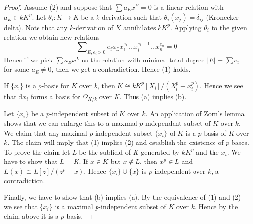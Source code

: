 \documentclass[10pt,a4paper]{amsart}
\theoremstyle{plain}
\theoremstyle{definition}
\theoremstyle{remark}
\numberwithin{equation}{subsection}
\begin{document}
\begin{proof}
Assume (2) and suppose that $\sum a_E x^E = 0$ is a linear relation
with $a_E \in k K^p$. Let $\theta_i : K \to K$ be a $k$-derivation such that
$\theta_i(x_j) = \delta_{ij}$ (Kronecker delta). Note that any $k$-derivation
of $K$ annihilates $kK^p$. Applying $\theta_i$ to the given relation we
obtain new relations
$$
\sum\nolimits_{E, e_i > 0}
e_i a_E x_1^{e_1}\ldots x_i^{e_i - 1} \ldots x_n^{e_n} = 0
$$
Hence if we pick $\sum a_E x^E$ as the relation with minimal
total degree $|E| = \sum e_i$ for some $a_E \not = 0$, then we
get a contradiction. Hence (1) holds.

\medskip\noindent
If $\{x_i\}$ is a $p$-basis for $K$ over $k$, then
$K \cong kK^p[X_i]/(X_i^p - x_i^p)$. Hence we see that
$\text{d}x_i$ forms a basis for $\Omega_{K/k}$ over $K$.
Thus (a) implies (b).

\medskip\noindent
Let $\{x_i\}$ be a $p$-independent subset of $K$ over $k$. An application
of Zorn's lemma shows that we can enlarge this to a maximal $p$-independent
subset of $K$ over $k$. We claim that any maximal $p$-independent subset
$\{x_i\}$ of $K$ is a $p$-basis of $K$ over $k$. The claim will imply
that (1) implies (2) and establish the existence of $p$-bases.
To prove the claim let $L$ be the subfield of $K$ generated by
$kK^p$ and the $x_i$. We have to show that $L = K$. If $x \in K$
but $x \not \in L$, then $x^p \in L$ and $L(x) \cong L[z]/(z^p - x)$.
Hence $\{x_i\} \cup \{x\}$ is $p$-independent over $k$, a contradiction.

\medskip\noindent
Finally, we have to show that (b) implies (a). By the equivalence of (1)
and (2) we see that $\{x_i\}$ is a maximal $p$-independent subset
of $K$ over $k$. Hence by the claim above it is a $p$-basis.
\end{proof}
\end{document}
